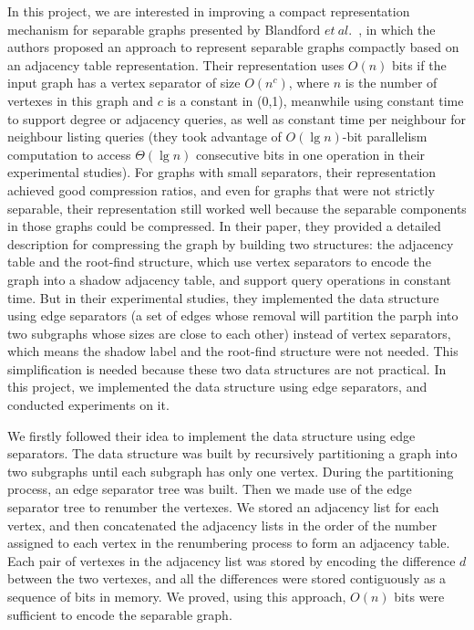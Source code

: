 \documentclass[12pt,glossary]{dalthesis}
\begin{document}
\bigskip


In this project, we are interested in improving a compact representation mechanism for separable graphs presented by Blandford $et \ al.$~\cite{compact-representation}, in which the authors proposed an approach to represent separable graphs compactly based on an adjacency table representation. Their representation uses $O(n)$ bits if the input graph has a vertex separator of size $O(n^{c})$, where $n$ is the number of vertexes in this graph and $c$ is a constant in (0,1), meanwhile using constant time to support degree or adjacency queries, as well as constant time per neighbour for neighbour listing queries (they took advantage of $O(\lg n)$-bit parallelism computation to access $\Theta(\lg n)$ consecutive bits in one operation in their experimental studies). For graphs with small separators, their representation achieved good compression ratios, and even for graphs that were not strictly separable, their representation still worked well because the separable components in those graphs could be compressed. In their paper, they provided a detailed description for compressing the graph by building two structures: the adjacency table and the root-find structure, which use vertex separators to encode the graph into a shadow adjacency table, and support query operations in constant time. But in their experimental studies, they implemented the data structure using edge separators (a set of edges whose removal will partition the parph into two subgraphs whose sizes are close to each other) instead of vertex separators, which means the shadow label and the root-find structure were not needed. This simplification is needed because these two data structures are not practical. In this project, we implemented the data structure using edge separators, and conducted experiments on it.

\bigskip
\bigskip

We firstly followed their idea to implement the data structure using edge separators. The data structure was built by recursively partitioning a graph into two subgraphs until each subgraph has only one vertex. During the partitioning process, an edge separator tree was built. Then we made use of the edge separator tree to renumber the vertexes. We stored an adjacency list for each vertex, and then concatenated the adjacency lists in the order of the number assigned to each vertex in the renumbering process to form an adjacency table. Each pair of vertexes in the adjacency list was stored by encoding the difference $d$ between the two vertexes, and all the differences were stored contiguously as a sequence of bits in memory. We proved, using this approach, $O(n)$ bits were sufficient to encode the separable graph. 
\end{document}
